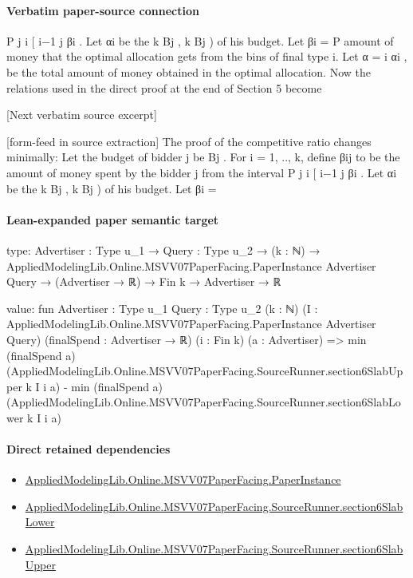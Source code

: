 \documentclass[10pt]{article}
\begin{document}
\paragraph{Verbatim paper-source connection}
\begin{ReviewVerbatim}
P j
i
[ i−1
j βi . Let αi be the
k Bj , k Bj ) of his budget. Let βi =
P amount of money that the optimal
allocation gets from the bins of final type i. Let α = i αi , be the total amount of money
obtained in the optimal allocation.
Now the relations used in the direct proof at the end of Section 5 become

[Next verbatim source excerpt]


[form-feed in source extraction]
The proof of the competitive ratio changes minimally: Let the budget of bidder j be Bj . For
i = 1, .., k, define βij to be the amount of money spent by the bidder j from the interval
P j
i
[ i−1
j βi . Let αi be the
k Bj , k Bj ) of his budget. Let βi =
\end{ReviewVerbatim}



\paragraph{Lean-expanded paper semantic target}
\begin{ReviewVerbatim}
type:
{Advertiser : Type u_1} →
  {Query : Type u_2} →
    (k : ℕ) →
      AppliedModelingLib.Online.MSVV07PaperFacing.PaperInstance Advertiser Query →
        (Advertiser → ℝ) → Fin k → Advertiser → ℝ

value:
fun {Advertiser : Type u_1} {Query : Type u_2} (k : ℕ)
    (I : AppliedModelingLib.Online.MSVV07PaperFacing.PaperInstance Advertiser Query) (finalSpend : Advertiser → ℝ)
    (i : Fin k) (a : Advertiser) =>
  min (finalSpend a) (AppliedModelingLib.Online.MSVV07PaperFacing.SourceRunner.section6SlabUpper k I i a) -
    min (finalSpend a) (AppliedModelingLib.Online.MSVV07PaperFacing.SourceRunner.section6SlabLower k I i a)
\end{ReviewVerbatim}

\paragraph{Direct retained dependencies}
\begin{itemize}\raggedright
\item \hyperlink{governing-declaration-11907576ec71eeb5}{Applied\allowbreak{}Modeling\allowbreak{}Lib.\allowbreak{}Online.\allowbreak{}MSVV07\allowbreak{}Paper\allowbreak{}Facing.\allowbreak{}Paper\allowbreak{}Instance}
\item \hyperlink{governing-declaration-7c01b80e7b94cbb4}{Applied\allowbreak{}Modeling\allowbreak{}Lib.\allowbreak{}Online.\allowbreak{}MSVV07\allowbreak{}Paper\allowbreak{}Facing.\allowbreak{}Source\allowbreak{}Runner.\allowbreak{}section6\allowbreak{}Slab\allowbreak{}Lower}
\item \hyperlink{governing-declaration-2de04a175576bf9a}{Applied\allowbreak{}Modeling\allowbreak{}Lib.\allowbreak{}Online.\allowbreak{}MSVV07\allowbreak{}Paper\allowbreak{}Facing.\allowbreak{}Source\allowbreak{}Runner.\allowbreak{}section6\allowbreak{}Slab\allowbreak{}Upper}
\end{itemize}
\end{document}
